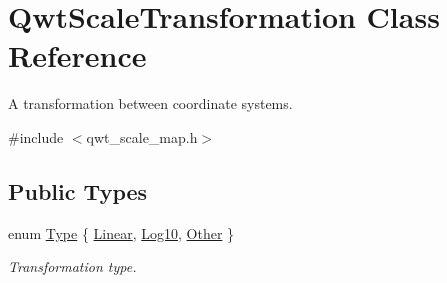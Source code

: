 \hypertarget{class_qwt_scale_transformation}{\section{Qwt\-Scale\-Transformation Class Reference}
\label{class_qwt_scale_transformation}
}


A transformation between coordinate systems.  




{\ttfamily \#include $<$qwt\-\_\-scale\-\_\-map.\-h$>$}

\subsection*{Public Types}
\begin{DoxyCompactItemize}
\item 
enum \hyperlink{class_qwt_scale_transformation_a5b4e85a0640906586b3180872aaeb786}{Type} \{ \hyperlink{class_qwt_scale_transformation_a5b4e85a0640906586b3180872aaeb786a77fdca4fe1efe2e60f6f0d6d730c6075}{Linear}, 
\hyperlink{class_qwt_scale_transformation_a5b4e85a0640906586b3180872aaeb786afd481a493e9324d472f2dd064f35f634}{Log10}, 
\hyperlink{class_qwt_scale_transformation_a5b4e85a0640906586b3180872aaeb786a0bff96a69468f488f8096a3e12c9316c}{Other}
 \}
\begin{DoxyCompactList}\small\item\em Transformation type. \end{DoxyCompactList}\end{DoxyCompactItemize}
